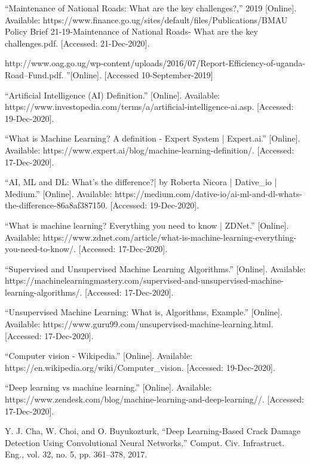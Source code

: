 \documentclass[12pt]{report}
\begin{document}
\begin{thebibliography}{1}
“Maintenance of National Roads: What are the key challenges?,” 2019 [Online]. Available: https://www.finance.go.ug/sites/default/files/Publications/BMAU Policy Brief 21-19-Maintenance of National Roads- What are the key challenges.pdf. [Accessed: 21-Dec-2020]. 

http://www.oag.go.ug/wp-content/uploads/2016/07/Report-Efficiency-of-uganda-Road--Fund.pdf. ''[Online]. [Accessed 10-September-2019]

“Artificial Intelligence (AI) Definition.” [Online]. Available: https://www.investopedia.com/terms/a/artificial-intelligence-ai.asp. [Accessed: 19-Dec-2020].


“What is Machine Learning? A definition - Expert System | Expert.ai.” [Online]. Available: https://www.expert.ai/blog/machine-learning-definition/. [Accessed: 17-Dec-2020].

“AI, ML and DL: What’s the difference?| by Roberta Nicora | Dative\_io | Medium.” [Online]. Available: https://medium.com/dative-io/ai-ml-and-dl-whats-the-difference-86a8af387150. [Accessed: 19-Dec-2020].


“What is machine learning? Everything you need to know | ZDNet.” [Online]. Available: https://www.zdnet.com/article/what-is-machine-learning-everything-you-need-to-know/. [Accessed: 17-Dec-2020].

“Supervised and Unsupervised Machine Learning Algorithms.” [Online]. Available: https://machinelearningmastery.com/supervised-and-unsupervised-machine-learning-algorithms/. [Accessed: 17-Dec-2020].

“Unsupervised Machine Learning: What is, Algorithms, Example.” [Online]. Available: https://www.guru99.com/unsupervised-machine-learning.html. [Accessed: 17-Dec-2020].

“Computer vision - Wikipedia.” [Online]. Available: https://en.wikipedia.org/wiki/Computer\_vision. [Accessed: 19-Dec-2020].

“Deep learning vs machine learning.” [Online]. Available: https://www.zendesk.com/blog/machine-learning-and-deep-learning//. [Accessed: 17-Dec-2020].

Y. J. Cha, W. Choi, and O. Buyukozturk, “Deep Learning-Based Crack Damage Detection Using Convolutional Neural Networks,” Comput. Civ. Infrastruct. Eng., vol. 32, no. 5, pp. 361–378, 2017.


\end{thebibliography}
\end{document}
